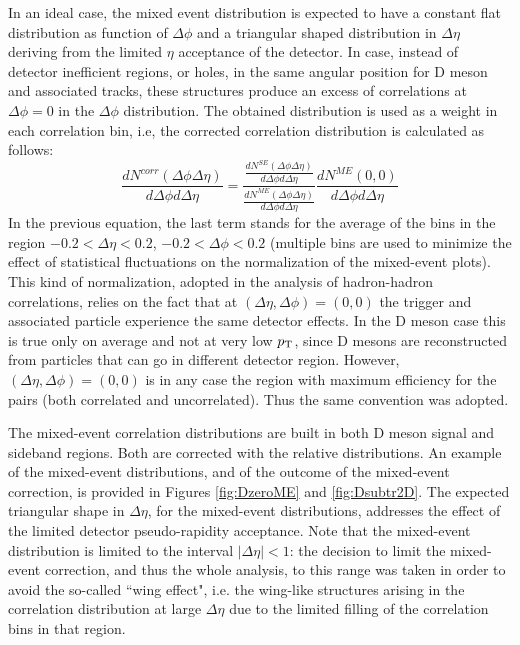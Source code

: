 In an ideal case, the mixed event distribution is expected to have a constant flat distribution as function of $\Delta\phi$ and a triangular shaped distribution in $\Delta\eta$
deriving from the limited $\eta$ acceptance of the detector. In case, instead of detector inefficient regions, or holes, in the same angular position for D meson and associated tracks, these structures produce an excess of correlations at $\Delta\phi=0$ in the $\Delta\phi$ distribution. The obtained distribution is used as a weight in each correlation bin, i.e, the corrected correlation distribution is calculated as follows:
\begin{equation}
\label{eq:mixing}
\frac{dN^{corr}\left(\Delta\phi \Delta\eta\right)}{d\Delta\phi d\Delta\eta} = \frac{\frac{dN^{SE}\left(\Delta\phi \Delta\eta\right)}{d\Delta\phi d\Delta\eta} }{\frac{dN^{ME}\left(\Delta\phi \Delta\eta\right)}{d\Delta\phi d\Delta\eta} }\frac{dN^{ME}\left(0,  0\right)}{d\Delta\phi d\Delta\eta}
\end{equation}
In the previous equation, the last term stands for the average of the bins in the region $-0.2 < \Delta\eta < 0.2$, $-0.2 < \Delta\phi < 0.2$ (multiple bins are used to minimize the effect of statistical fluctuations on the normalization of the mixed-event plots).
This kind of normalization, adopted in the analysis of hadron-hadron correlations, relies on the fact that at $(\Delta\eta,\Delta\phi)=(0,0)$ the trigger and associated particle experience the same detector effects. In the D meson case this is true only on average and not at very low $p_{\rm T}$, since D mesons are reconstructed from particles that can go
in different detector region. However, $(\Delta\eta,\Delta\phi)=(0,0)$ is in any case
the region with maximum efficiency for the pairs (both correlated and uncorrelated). Thus the same convention was adopted.

The mixed-event correlation distributions are built in both D meson signal and sideband regions. Both are
corrected with the relative distributions. An example of the mixed-event distributions, and of the outcome of the mixed-event correction, is provided in Figures \ref{fig:DzeroME} and \ref{fig:Dsubtr2D}. The expected triangular shape in $\Delta\eta$, for the mixed-event distributions, addresses the effect of the limited detector pseudo-rapidity acceptance. Note that the mixed-event distribution is limited to the interval $\left|\Delta\eta\right|<1$: the decision to limit the mixed-event correction, and thus the whole analysis, to this range was taken in order to avoid the so-called ``wing effect", i.e. the wing-like structures arising in the correlation distribution at large $\Delta\eta$ due to the
limited filling of the correlation bins in that region.


